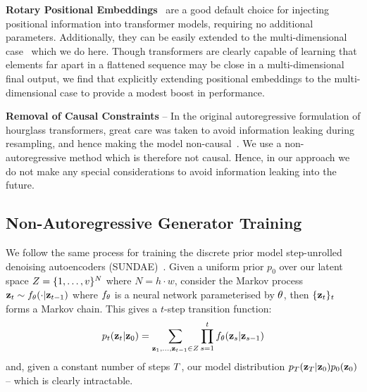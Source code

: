 
\textbf{Rotary Positional Embeddings}~\cite{su2021roformer} are a good default
choice for injecting positional information into transformer models, requiring
no additional parameters. Additionally, they can be easily extended to the
multi-dimensional case~\cite{rope-eleutherai} which we do here. Though
transformers are clearly capable of learning that elements far apart in a
flattened sequence may be close in a multi-dimensional final output, we find
that explicitly extending positional embeddings to the multi-dimensional case to
provide a modest boost in performance.


\textbf{Removal of Causal Constraints} -- In the original autoregressive
formulation of hourglass transformers, great care was taken to avoid information
leaking during resampling, and hence making the model
non-causal~\cite{nawrot2021hierarchical}. We use a non-autoregressive method
which is therefore not causal. Hence, in our approach we do not make any special
considerations to avoid information leaking into the future.

\subsection{Non-Autoregressive Generator Training}
We follow the same process for training the discrete prior model step-unrolled
denoising autoencoders (SUNDAE)~\cite{savinov2022stepunrolled}. Given a uniform
prior $p_0$ over our latent space $Z = \{1, \dots,
v\}^N$ where $N=h\cdot w$, consider the Markov process
$\mathbf{z}_t \sim f_\theta(\cdot \vert \mathbf{z}_{t-1})$ where $f_\theta$ is a neural
network
parameterised by $\theta$, then $\{\mathbf{z}_t\}_t$ forms a Markov
chain. This gives a $t$-step transition function:
\begin{equation}\label{eq:markov}
    p_t(\mathbf{z}_t \vert \mathbf{z}_0) = \sum\limits_{\mathbf{z}_1, \dots,
    \mathbf{z}_{t-1} \in Z} \prod\limits^t_{s=1} f_\theta(\mathbf{z}_s | \mathbf{z}_{s-1})
\end{equation}\cite{savinov2022stepunrolled}
and, given a constant number of steps $T$, our model distribution
$p_T(\mathbf{z}_T \vert \mathbf{z}_0)p_0(\mathbf{z}_0)$ -- which is
clearly intractable.

